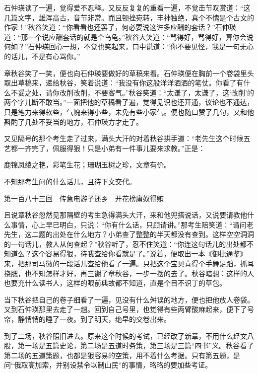 \documentclass[12pt,UTF8]{ctexbook}
\begin{document}
{{{石仲瑛读了一遍，觉得爱不忍释。又反反复复的重看一遍，不觉击节叹赏道：“这几篇文字，雄浑高古，音节非常。而且顿挫宛转，丰神独绝，真个不愧是个古文的作家！”秋谷笑道：“你看看也还罢了，何必要说这许多应酬的套话？”石仲瑛道：“那一个说应酬套话的就是个乌龟。”秋谷大笑道：“骂得好，骂得好，算你会说何如？”石仲瑛回心一想，不觉也笑起来，口中说道：“你不要见怪，我是一句无心的话儿，不是有心骂你。”

章秋谷笑了一笑，便也向石仲瑛要做好的草稿来看。石仲瑛便在胸前一个卷袋里头取出草稿来，递给秋谷，笑着说道：“我没有你这般洋洋洒洒的笔仗。你看了有什么不妥之处，请你改削改削，不要客气。”秋谷笑道：“太谦了，太谦了，这‘改削’的两个字儿断不敢当。”一面把他的草稿看了遍，觉得见识也还开通，议论也不通达，只是笔力来得软些，气魄来得小些，未免有些小家气。便也随口赞了几句，又和他斟酌了几处不妥当的地方，石仲瑛方才走了。

又见隔号的那个考生走了过来，满头大汗的对着秋谷拱手道：“老先生这个时候五艺都一齐完了，佩服得狠！只是小弟有一件事儿要来求教。”正是：

鹿锦凤绫之艳，彩笔生花；珊瑚玉树之珍，文章有价。

不知那考生问的什么话儿，且待下文交代。





第一百八十三回　传急电游子还乡　开花榜庸奴得贿





且说章秋谷忽然见那隔壁的考生急得满头大汗，来和他兜搭说话，又说要请教他什么事情，心上早已明白，只说：“你有什么话，只顾请讲。”那考生陪笑道：“请问老先生，这二题的出处在什么地方？小弟查了整整的半天都没有查到。这样空空洞洞的一句话儿，教人从何查起？”秋谷听了，忍不住笑道：“你连这句话儿的出处都不知道么？这个容易得狠，待我查给你看就是了。”说着，便取出一本《御批通鉴》来，把那司马徽的一段话儿查给他看了一遍。只把这个宝贝喜得个手舞足蹈，抓耳挠腮，也不知怎样才好，再三谢了章秋谷，一步一摆的去了。秋谷暗想：这样的人也要充什么读书人，这样的眼前典故都不知道，直是个目不识丁的草包。

当下秋谷把自己的卷子细看了一遍，见没有什么舛误的地方，便也把他放人卷袋。又到石仲瑛那里去走了一趟。回到自己号里，也觉得有些两臂酸麻起来，便下了号帘，静悄悄的睡了一夜。到了明天，绝早的交卷出来。

到了二场，秋谷照旧进去。原来这个时候的考试，已经改了新章，不用什么经文八股，第一场是五篇史论，第二场是五道时务策，第三场是三篇“四书”义。秋谷看了第二场的五道策题，也都是狠容易的空策，用不着什么考据。只有第五题，是问“俄取高加索，并别设禁令以制山民”的事情，略略的要加些考证。

}}}
\end{document}
